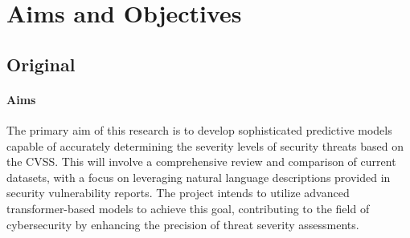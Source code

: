 \documentclass[12pt]{article}
\begin{document}
\printbibliography[title={References}]







\section{Aims and Objectives}


\subsection*{Original}

\paragraph{Aims}
The primary aim of this research is to develop sophisticated predictive models capable of accurately determining
the severity levels of security threats based on the CVSS. This will involve a comprehensive review and comparison
of current datasets, with a focus on leveraging natural language descriptions provided in security vulnerability reports.
The project intends to utilize advanced transformer-based models to achieve this goal, contributing to the field of
cybersecurity by enhancing the precision of threat severity assessments.
\end{document}
